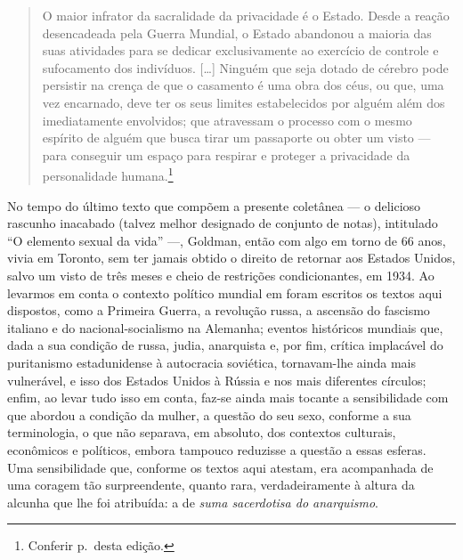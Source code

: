 \begin{quote}
O maior infrator da sacralidade da privacidade é o Estado. Desde a
reação desencadeada pela Guerra Mundial, o Estado abandonou a maioria
das suas atividades para se dedicar exclusivamente ao exercício de
controle e sufocamento dos indivíduos. {[}\ldots{]} Ninguém que seja dotado
de cérebro pode persistir na crença de que o casamento é uma obra dos
céus, ou que, uma vez encarnado, deve ter os seus limites estabelecidos
por alguém além dos imediatamente envolvidos; que atravessam o processo
com o mesmo espírito de alguém que busca tirar um passaporte ou obter um
visto --- para conseguir um espaço para respirar e proteger a privacidade
da personalidade humana.\footnote{Conferir p.\,\pageref{ref3} desta edição.}
\end{quote}

No tempo do último texto que compõem a presente coletânea --- o delicioso
rascunho inacabado (talvez melhor designado de conjunto de notas),
intitulado ``O elemento sexual da vida'' ---, Goldman, então com algo em
torno de 66 anos, vivia em Toronto, sem ter jamais obtido o
direito de retornar aos Estados Unidos, salvo um visto de três meses e
cheio de restrições condicionantes, em 1934. Ao levarmos em conta o
contexto político mundial em foram escritos os textos aqui dispostos,
como a Primeira Guerra, a revolução russa, a ascensão do fascismo
italiano e do nacional-socialismo na Alemanha; eventos históricos
mundiais que, dada a sua condição de russa, judia, anarquista e, por
fim, crítica implacável do puritanismo estadunidense à autocracia
soviética, tornavam-lhe ainda mais vulnerável, e isso dos Estados Unidos
à Rússia e nos mais diferentes círculos; enfim, ao levar tudo isso em
conta, faz-se ainda mais tocante a sensibilidade com que abordou a
condição da mulher, a questão do seu sexo, conforme a sua terminologia,
o que não separava, em absoluto, dos contextos culturais, econômicos e
políticos, embora tampouco reduzisse a questão a essas esferas. Uma
sensibilidade que, conforme os textos aqui atestam, era acompanhada de
uma coragem tão surpreendente, quanto rara, verdadeiramente à altura da
alcunha que lhe foi atribuída: a de \textit{suma sacerdotisa do anarquismo}.

